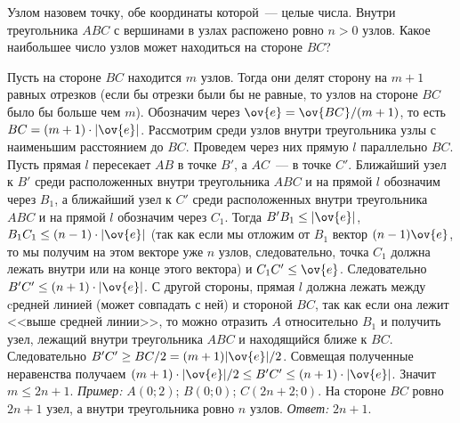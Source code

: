 Узлом назовем точку, обе координаты которой~--- целые числа.
Внутри треугольника $ABC$ с вершинами в узлах распожено ровно $n > 0$ узлов.
Какое наибольшее число узлов может находиться на стороне $BC$?

\solution
Пусть на стороне $BC$ находится $m$ узлов.
Тогда они делят сторону на $m + 1$ равных отрезков
(если бы отрезки были бы не равные, то узлов на стороне $BC$ было бы больше чем
$m$).
Обозначим через $\ov{e} = \ov{BC} / (m + 1)$, то есть
$BC = (m + 1) \cdot |\ov{e}|$.
Рассмотрим среди узлов внутри треугольника узлы с наименьшим расстоянием до
$BC$.
Проведем через них прямую $l$ параллельно $BC$.
Пусть прямая $l$ пересекает $AB$ в точке $B'$, а $AC$~--- в точке $C'$.
Ближайший узел к $B'$ среди расположенных внутри треугольника $ABC$ и на прямой
$l$ обозначим через $B_1$, а ближайший узел к $C'$ среди расположенных внутри
треугольника $ABC$ и на прямой $l$ обозначим через $C_1$.
Тогда $B'B_1 \leq |\ov{e}|$, $B_1C_1 \leq (n - 1) \cdot |\ov{e}|$
(так как если мы отложим от $B_1$ вектор $(n - 1) \ov{e}$, то мы получим на
этом векторе уже $n$ узлов, следовательно, точка $C_1$ должна лежать внутри или
на конце этого вектора)
и $C_1C' \leq \ov{e}$.
Следовательно $B'C' \leq (n + 1) \cdot |\ov{e}|$.
С другой стороны, прямая $l$ должна лежать между cредней линией
(может совпадать с ней) и стороной $BC$, так как если она лежит
<<выше средней линии>>, то можно отразить $A$ относительно $B_1$ и получить
узел, лежащий внутри треугольника $ABC$ и находящийся ближе к $BC$.
Следовательно $B'C' \geq BC / 2 = (m + 1) |\ov{e}| / 2$.
Совмещая полученные неравенства получаем
$(m + 1) \cdot |\ov{e}| / 2 \leq B'C' \leq (n + 1) \cdot |\ov{e}|$.
Значит $m \leq 2 n + 1$.
\emph{Пример:} $A(0; 2)$; $B(0; 0)$; $C(2 n + 2; 0)$.
На стороне $BC$ ровно $2 n + 1$ узел, а внутри треугольника ровно $n$ узлов.
\emph{Ответ:} $2 n + 1$.

